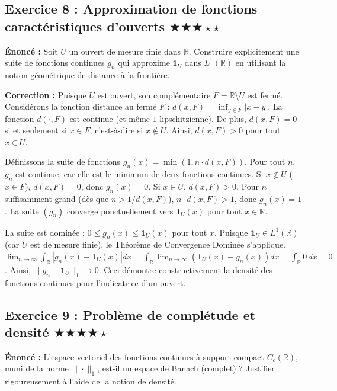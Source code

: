 \documentclass[11pt,a4paper]{article}
\begin{document}
\subsection*{Exercice 8 : Approximation de fonctions caractéristiques d'ouverts \quad $\bigstar\bigstar\bigstar\star\star$}

\textbf{Énoncé :}
Soit $U$ un ouvert de mesure finie dans $\mathbb{R}$. Construire explicitement une suite de fonctions continues $g_n$ qui approxime $\mathbf{1}_U$ dans $L^1(\mathbb{R})$ en utilisant la notion géométrique de distance à la frontière.

\textbf{Correction :}
Puisque $U$ est ouvert, son complémentaire $F = \mathbb{R} \setminus U$ est fermé.
Considérons la fonction distance au fermé $F$ :
$d(x, F) = \inf_{y \in F} |x - y|$.
La fonction $d(\cdot, F)$ est continue (et même $1$-lipschitzienne). De plus, $d(x, F) = 0$ si et seulement si $x \in F$, c'est-à-dire si $x \notin U$.
Ainsi, $d(x, F) > 0$ pour tout $x \in U$.

Définissons la suite de fonctions $g_n(x) = \min(1, n \cdot d(x, F))$.
Pour tout $n$, $g_n$ est continue, car elle est le minimum de deux fonctions continues.
Si $x \notin U$ ($x \in F$), $d(x, F) = 0$, donc $g_n(x) = 0$.
Si $x \in U$, $d(x, F) > 0$. Pour $n$ suffisamment grand (dès que $n > 1/d(x, F)$), $n \cdot d(x, F) > 1$, donc $g_n(x) = 1$.
La suite $(g_n)$ converge ponctuellement vers $\mathbf{1}_U(x)$ pour tout $x \in \mathbb{R}$.

La suite est dominée : $0 \le g_n(x) \le \mathbf{1}_U(x)$ pour tout $x$.
Puisque $\mathbf{1}_U \in L^1(\mathbb{R})$ (car $U$ est de mesure finie), le Théorème de Convergence Dominée s'applique.
$\lim_{n \to \infty} \int_{\mathbb{R}} |g_n(x) - \mathbf{1}_U(x)| dx = \int_{\mathbb{R}} \lim_{n \to \infty} (\mathbf{1}_U(x) - g_n(x)) dx = \int_{\mathbb{R}} 0 \, dx = 0$.
Ainsi, $\| g_n - \mathbf{1}_U \|_1 \to 0$. Ceci démontre constructivement la densité des fonctions continues pour l'indicatrice d'un ouvert.


\subsection*{Exercice 9 : Problème de complétude et densité \quad $\bigstar\bigstar\bigstar\bigstar\star$}

\textbf{Énoncé :}
L'espace vectoriel des fonctions continues à support compact $C_c(\mathbb{R})$, muni de la norme $\| \cdot \|_1$, est-il un espace de Banach (complet) ? Justifier rigoureusement à l'aide de la notion de densité.
\end{document}
